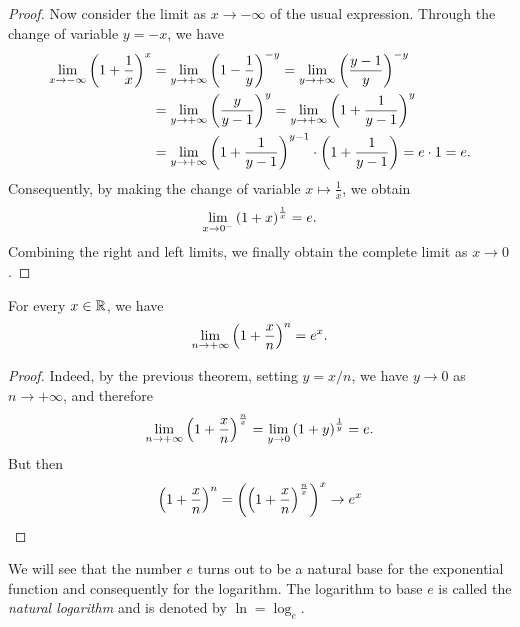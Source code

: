 \begin{proof}
  Now consider the limit as $x\to -\infty$ 
  of the usual expression. 
  Through the change of variable $y=-x$, we have 
  \begin{align*}
  \lim_{x\to -\infty} {\left( 1+\frac{1}{x} \right)}^x 
  &= \lim_{y\to +\infty} {\left( 1 - \frac 1 y \right)}^{-y}
   = \lim_{y\to +\infty} {\left( \frac {y-1} y \right)}^{-y}\\
  &= \lim_{y\to +\infty} {\left( \frac{y}{y-1} \right)}^y
   = \lim_{y\to +\infty} {\left( 1 + \frac{1}{y-1} \right)}^y\\
  &= \lim_{y\to +\infty} {\left( 1 + \frac{1}{y-1} \right)}^{y-1}
    \cdot{\left( 1+\frac 1 {y-1} \right)} 
    = e\cdot 1 = e.\\
  \end{align*}
  Consequently, by making the change of variable $x\mapsto \frac 1 x$, 
  we obtain
  \[
  \lim_{x\to 0^-} {\left( 1+x \right)}^{\frac 1 x} = e.
  \]
    Combining the right and left limits, we finally obtain the complete limit as
  $x\to 0$.
\end{proof}
%
\begin{corollary}%
\label{cor:limite_notevole_ex}%
\mymark{**}%
For every $x\in {\mathbb R}$, we have
\[
  \lim_{n\to +\infty} {\left( 1+ \frac x n \right)}^n = e^x.
\]
\end{corollary}
%
\begin{proof}
Indeed, by the previous theorem, setting $y = x/n$, we have
$y\to 0$ as $n\to +\infty$, and therefore
\[
\lim_{n\to +\infty}{\left( 1+\frac x n \right)}^{\frac n x} 
= \lim_{y\to 0} {\left( 1+y \right)}^{\frac 1 y}
= e.
\]
But then
\[
{\left( 1+ \frac x n \right)}^n = {\left( {\left( 1+\frac x n \right)}^{\frac n x} \right)}^x
\to e^x
\]
\end{proof}

\begin{definition}
We will see that the number $e$ turns out to be a natural base for the
exponential
function and consequently for the logarithm. The logarithm to base
$e$ is called the \emph{natural logarithm}%
%
 and is denoted by $\ln = \log_e$.
\end{definition}


